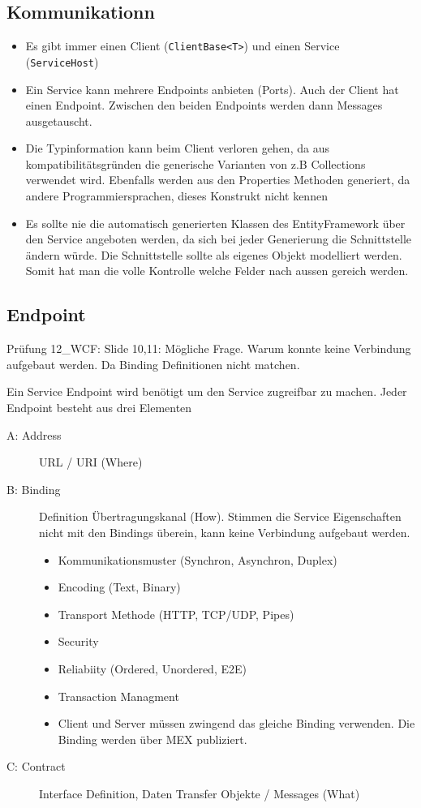 \subsection{Kommunikationn}
\begin{itemize}
	\item Es gibt immer einen Client (\lstinline|ClientBase<T>|) und einen Service (\lstinline|ServiceHost|)
	\item Ein Service kann mehrere Endpoints anbieten (Ports). Auch der Client hat einen Endpoint. Zwischen den beiden Endpoints werden dann Messages ausgetauscht. 
	\item Die Typinformation kann beim Client verloren gehen, da aus kompatibilitätsgründen die generische Varianten von z.B Collections verwendet wird. Ebenfalls werden aus den Properties Methoden generiert, da andere Programmiersprachen, dieses Konstrukt nicht kennen
	\item Es sollte nie die automatisch generierten Klassen des EntityFramework über den Service angeboten werden, da sich bei jeder Generierung die Schnittstelle ändern würde. Die Schnittstelle sollte als eigenes Objekt modelliert werden. Somit hat man die volle Kontrolle welche Felder nach aussen gereich werden. 
\end{itemize}


\clearpage

\subsection{Endpoint}
\begin{hint}{Prüfung}{}
12\_WCF: Slide 10,11: Mögliche Frage. Warum konnte keine Verbindung aufgebaut werden. Da Binding Definitionen nicht matchen.
\end{hint}

Ein Service Endpoint wird benötigt um den Service zugreifbar zu machen. Jeder Endpoint besteht aus drei Elementen
\begin{description}
	\item[A: Address] URL / URI (Where)
	\item[B: Binding] Definition Übertragungskanal (How). Stimmen die Service Eigenschaften nicht mit den Bindings überein, kann keine Verbindung aufgebaut werden. 
	\begin{itemize}
		\item Kommunikationsmuster (Synchron, Asynchron, Duplex)
		\item Encoding (Text, Binary)
		\item Transport Methode (HTTP, TCP/UDP, Pipes)
		\item Security
		\item Reliabiity (Ordered, Unordered, E2E)
		\item Transaction Managment
		\item Client und Server müssen zwingend das gleiche Binding verwenden. Die Binding werden über MEX publiziert.
	\end{itemize}
	\item[C: Contract] Interface Definition, Daten Transfer Objekte / Messages (What)
\end{description}

